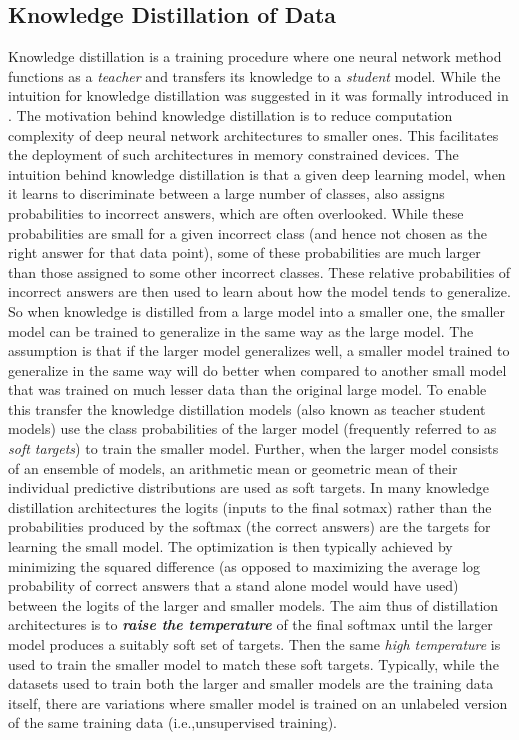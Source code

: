 \documentclass{article}
\begin{document}
\subsection{Knowledge Distillation of Data}
Knowledge distillation is a training procedure where one neural network method functions as a \textit{teacher} and transfers its knowledge to a \textit{student} model. While the intuition for knowledge distillation was suggested in \citep*{ba2014deep} it was formally introduced in \citep*{hinton2015distilling}. The motivation behind knowledge distillation is to reduce computation complexity of deep neural network architectures to smaller ones. This facilitates the deployment of such architectures in memory constrained devices. The intuition behind knowledge distillation is that a given deep learning model, when it learns to discriminate between a large number of classes, also assigns probabilities to incorrect answers, which are often overlooked. While these probabilities are small for a given incorrect class (and hence not chosen as the right answer for that data point), some of these probabilities are much larger than those assigned to some other incorrect classes. These relative probabilities of incorrect answers are then used  to learn about how the model tends to generalize. So when knowledge is distilled from a large model into a smaller one, the smaller model can be trained to generalize in the same way as the large model. The assumption is that if the larger model generalizes well, a smaller model trained to generalize in the same way will do better when compared to another small model that was trained on much lesser data than the original large model. To enable this transfer the knowledge distillation models (also known as teacher student models) use the class probabilities of the larger model (frequently referred to as \textit{soft targets}) to train the smaller model. Further, when the larger model consists of an ensemble of models, an arithmetic mean or geometric mean of their individual predictive distributions are used as soft targets. In many knowledge distillation architectures the logits (inputs to the final sotmax) rather than the probabilities produced by the softmax (the correct answers) are the targets for learning the small model. The optimization is then typically achieved by minimizing the squared difference (as opposed to maximizing the average log probability of correct answers that a stand alone model would have used) between the logits of the larger and smaller models. The aim thus of distillation architectures is to \textbf{\textit{raise the temperature}} of the final softmax until the larger model produces a suitably soft set of targets. Then the same \textit{high temperature} is used to train the smaller model to match these soft targets. Typically, while the datasets used to train both the larger and smaller models are the training data itself, there are variations where smaller model is trained on an unlabeled version of the same training data (i.e.,unsupervised training).
\end{document}
